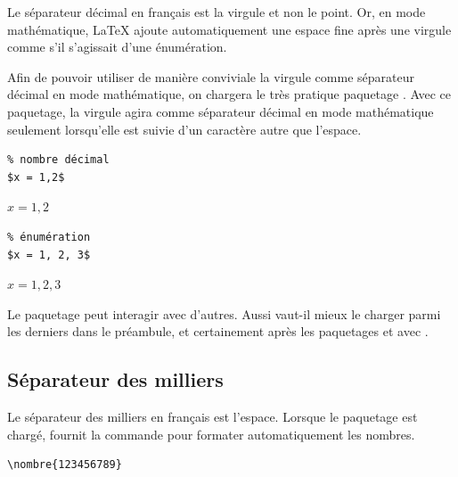 Le séparateur décimal en français est la virgule et non le point. Or,
en mode mathématique, LaTeX ajoute automatiquement une espace fine
après une virgule comme s'il s'agissait d'une énumération.

Afin de pouvoir utiliser de manière conviviale la virgule comme
séparateur décimal en mode mathématique, on chargera le très pratique
paquetage  \citep{icomma}. Avec ce paquetage, la virgule
agira comme séparateur décimal en mode mathématique seulement
lorsqu'elle est suivie d'un caractère autre que l'espace.
\begin{demo}
  \begin{minipage}{0.5\linewidth}
    \begin{texample}[0.6\linewidth]
\begin{lstlisting}
% nombre décimal
$x = 1,2$
\end{lstlisting}
      \producing
      $x = 1,2$
    \end{texample}
  \end{minipage}
  \hfill
  \begin{minipage}{0.5\linewidth}
    \begin{texample}[0.6\linewidth]
\begin{lstlisting}
% énumération
$x = 1, 2, 3$
\end{lstlisting}
      \producing
      $x = 1, 2, 3$
    \end{texample}
  \end{minipage}
\end{demo}

\begin{important}
  Le paquetage  peut interagir avec d'autres. Aussi
  vaut-il mieux le charger parmi les derniers dans le préambule, et
  certainement après les paquetages  et
   avec {\XeLaTeX}.
\end{important}

\subsection{Séparateur des milliers}
\label{sec:bases:francais:milliers}

Le séparateur des milliers en français est l'espace. Lorsque le
paquetage  \citep{numprint} est chargé, 
fournit la commande \cmd{\nombre} pour formater automatiquement les
nombres.
\begin{demo}
  \begin{texample}
\begin{lstlisting}
\nombre{123456789}
\end{lstlisting}
    \producing
  \end{texample}
\end{demo}

